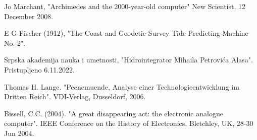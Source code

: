 \documentclass[a4paper]{article}
\begin{document}
		\pagebreak
		
		

\appendix

\begin{thebibliography}{9}



 Jo Marchant, "Archimedes and the 2000-year-old computer" New Scientist, 12 December 2008.

 E G Fischer (1912), "The Coast and Geodetic Survey Tide Predicting Machine No. 2".

 Srpska akademija nauka i umetnosti, "Hidrointegrator Mihaila Petrovića Alasa". Pristupljeno 6.11.2022.

 Thomas H. Lange. "Peenemuende, Analyse einer Technologieentwicklung im Dritten Reich". VDI-Verlag, Dusseldorf, 2006.
			
 Bissell, C.C. (2004). "A great disappearing act: the electronic analogue computer". IEEE Conference on the History of Electronics, Bletchley, UK, 28-30 Jun 2004.


\end{thebibliography}
\end{document}
